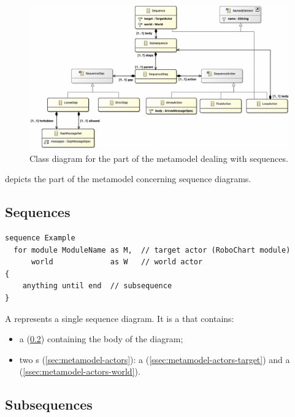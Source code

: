 \begin{figure}
	\centering
	\includegraphics[width=\textwidth]{diagrams/sequences.png}
	\caption{Class diagram for the part of the \langname{} metamodel dealing with sequences.}
	\label{fig:metamodel-sequences}
\end{figure}

 depicts the part of the metamodel concerning
sequence diagrams.

\subsection{Sequences}

\begin{lstlisting}[style=Example]
sequence Example
  for module ModuleName as M,  // target actor (RoboChart module)
      world             as W   // world actor
{
	anything until end  // subsequence
}
\end{lstlisting}

A \msequence{} represents a single sequence diagram.  It is a \mnamedelement{}
that contains:

\begin{itemize}
\item
	a \msubsequence{} (\cref{ssec:metamodel-sequences-subsequences})
	containing the body of the diagram;
\item
	two \mactor s (\cref{sec:metamodel-actors}):
	a \mtargetactor{} (\cref{ssec:metamodel-actors-target})
	and a \mworld{} (\cref{ssec:metamodel-actors-world}).
\end{itemize}

\subsection{Subsequences}\label{ssec:metamodel-sequences-subsequences}

